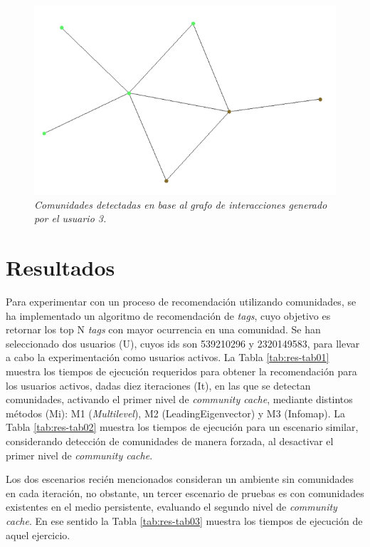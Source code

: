 \begin{figure}
  \centering
  \includegraphics[scale=.7]{images/Figura5-7}
  \caption{\em Comunidades detectadas en base al grafo de interacciones generado por el usuario 3.}
  \label{fig:exp-im7}
\end{figure}

\section{Resultados}

Para experimentar con un proceso de recomendación utilizando comunidades, se ha implementado un algoritmo de recomendación de \textit{tags}, cuyo objetivo es retornar los top N \textit{tags} con mayor ocurrencia en una comunidad. Se han seleccionado dos usuarios (U), cuyos ids son 539210296 y 2320149583, para llevar a cabo la experimentación como usuarios activos. La Tabla \ref{tab:res-tab01} muestra los tiempos de ejecución requeridos para obtener la recomendación para los usuarios activos, dadas diez iteraciones (It), en las que se detectan comunidades, activando el primer nivel de \textit{community cache}, mediante distintos métodos (Mi): M1 (\textit{Multilevel}), M2 (LeadingEigenvector) y M3 (Infomap). La Tabla \ref{tab:res-tab02} muestra los tiempos de ejecución para un escenario similar, considerando detección de comunidades de manera forzada, al desactivar el primer nivel de \textit{community cache}.

Los dos escenarios recién mencionados consideran un ambiente sin comunidades en cada iteración, no obstante, un tercer escenario de pruebas es con comunidades existentes en el medio persistente, evaluando el segundo nivel de \textit{community cache}. En ese sentido la Tabla \ref{tab:res-tab03} muestra los tiempos de ejecución de aquel ejercicio.

